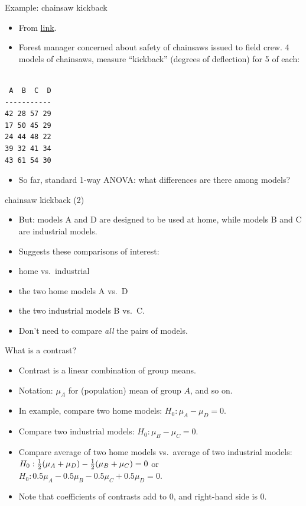 \documentclass[
  ignorenonframetext,
]{beamer}
\providecommand{\tightlist}{%
  \setlength{\itemsep}{0pt}\setlength{\parskip}{0pt}}\usepackage{longtable,booktabs,array}
\begin{document}
\begin{frame}[fragile]{Example: chainsaw kickback}
\protect\hypertarget{example-chainsaw-kickback}{}
\begin{itemize}
\item
  From
  \href{http://www.ohio.edu/plantbio/staff/mccarthy/quantmet/lectures/ANOVA2.pdf}{link}.
\item
  Forest manager concerned about safety of chainsaws issued to field
  crew. 4 models of chainsaws, measure ``kickback'' (degrees of
  deflection) for 5 of each:
\end{itemize}

\begin{verbatim}

 A  B  C  D
-----------
42 28 57 29
17 50 45 29
24 44 48 22
39 32 41 34
43 61 54 30
\end{verbatim}

\begin{itemize}
\tightlist
\item
  So far, standard 1-way ANOVA: what differences are there among models?
\end{itemize}
\end{frame}

\begin{frame}{chainsaw kickback (2)}
\protect\hypertarget{chainsaw-kickback-2}{}
\begin{itemize}
\item
  But: models A and D are designed to be used at home, while models B
  and C are industrial models.
\item
  Suggests these comparisons of interest:
\item
  home vs.~industrial
\item
  the two home models A vs.~D
\item
  the two industrial models B vs.~C.
\item
  Don't need to compare \emph{all} the pairs of models.
\end{itemize}
\end{frame}

\begin{frame}{What is a contrast?}
\protect\hypertarget{what-is-a-contrast}{}
\begin{itemize}
\item
  Contrast is a linear combination of group means.
\item
  Notation: \(\mu_A\) for (population) mean of group \(A\), and so on.
\item
  In example, compare two home models: \(H_0: \mu_A-\mu_D=0\).
\item
  Compare two industrial models: \(H_0: \mu_B-\mu_C=0\).
\item
  Compare average of two home models vs.~average of two industrial
  models: \(H_0: \frac{1}{2}(\mu_A+\mu_D)-{1\over 2}(\mu_B+\mu_C)=0\) or
  \(H_0: 0.5\mu_A-0.5\mu_B-0.5\mu_C+0.5\mu_D=0\).
\item
  Note that coefficients of contrasts add to 0, and right-hand side is
  0.
\end{itemize}
\end{frame}
\end{document}
